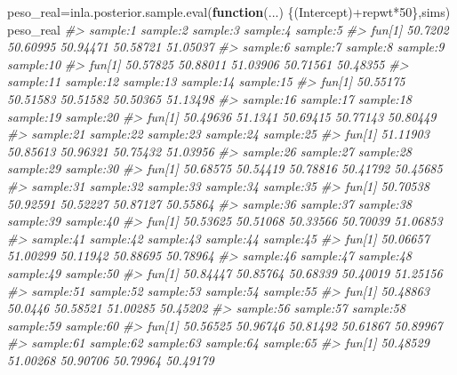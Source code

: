 \documentclass[
]{book}
\newenvironment{Shaded}{\begin{snugshade}}{\end{snugshade}}
\newcommand{\CommentTok}[1]{\textcolor[rgb]{0.56,0.35,0.01}{\textit{#1}}}
\newcommand{\ControlFlowTok}[1]{\textcolor[rgb]{0.13,0.29,0.53}{\textbf{#1}}}
\newcommand{\DecValTok}[1]{\textcolor[rgb]{0.00,0.00,0.81}{#1}}
\newcommand{\FunctionTok}[1]{\textcolor[rgb]{0.00,0.00,0.00}{#1}}
\newcommand{\NormalTok}[1]{#1}
\newcommand{\OtherTok}[1]{\textcolor[rgb]{0.56,0.35,0.01}{#1}}
\newcommand{\SpecialCharTok}[1]{\textcolor[rgb]{0.00,0.00,0.00}{#1}}
\begin{document}
\begin{Shaded}
\begin{Highlighting}[]
\NormalTok{peso\_real}\OtherTok{=}\FunctionTok{inla.posterior.sample.eval}\NormalTok{(}\ControlFlowTok{function}\NormalTok{(...) \{(Intercept)}\SpecialCharTok{+}\NormalTok{repwt}\SpecialCharTok{*}\DecValTok{50}\NormalTok{\},sims)}
\NormalTok{peso\_real}
\CommentTok{\#\textgreater{}        sample:1 sample:2 sample:3 sample:4 sample:5}
\CommentTok{\#\textgreater{} fun[1]  50.7202 50.60995 50.94471 50.58721 51.05037}
\CommentTok{\#\textgreater{}        sample:6 sample:7 sample:8 sample:9 sample:10}
\CommentTok{\#\textgreater{} fun[1] 50.57825 50.88011 51.03906 50.71561  50.48355}
\CommentTok{\#\textgreater{}        sample:11 sample:12 sample:13 sample:14 sample:15}
\CommentTok{\#\textgreater{} fun[1]  50.55175  50.51583  50.51582  50.50365  51.13498}
\CommentTok{\#\textgreater{}        sample:16 sample:17 sample:18 sample:19 sample:20}
\CommentTok{\#\textgreater{} fun[1]  50.49636   51.1341  50.69415  50.77143  50.80449}
\CommentTok{\#\textgreater{}        sample:21 sample:22 sample:23 sample:24 sample:25}
\CommentTok{\#\textgreater{} fun[1]  51.11903  50.85613  50.96321  50.75432  51.03956}
\CommentTok{\#\textgreater{}        sample:26 sample:27 sample:28 sample:29 sample:30}
\CommentTok{\#\textgreater{} fun[1]  50.68575  50.54419  50.78816  50.41792  50.45685}
\CommentTok{\#\textgreater{}        sample:31 sample:32 sample:33 sample:34 sample:35}
\CommentTok{\#\textgreater{} fun[1]  50.70538  50.92591  50.52227  50.87127  50.55864}
\CommentTok{\#\textgreater{}        sample:36 sample:37 sample:38 sample:39 sample:40}
\CommentTok{\#\textgreater{} fun[1]  50.53625  50.51068  50.33566  50.70039  51.06853}
\CommentTok{\#\textgreater{}        sample:41 sample:42 sample:43 sample:44 sample:45}
\CommentTok{\#\textgreater{} fun[1]  50.06657  51.00299  50.11942  50.88695  50.78964}
\CommentTok{\#\textgreater{}        sample:46 sample:47 sample:48 sample:49 sample:50}
\CommentTok{\#\textgreater{} fun[1]  50.84447  50.85764  50.68339  50.40019  51.25156}
\CommentTok{\#\textgreater{}        sample:51 sample:52 sample:53 sample:54 sample:55}
\CommentTok{\#\textgreater{} fun[1]  50.48863   50.0446  50.58521  51.00285  50.45202}
\CommentTok{\#\textgreater{}        sample:56 sample:57 sample:58 sample:59 sample:60}
\CommentTok{\#\textgreater{} fun[1]  50.56525  50.96746  50.81492  50.61867  50.89967}
\CommentTok{\#\textgreater{}        sample:61 sample:62 sample:63 sample:64 sample:65}
\CommentTok{\#\textgreater{} fun[1]  50.48529  51.00268  50.90706  50.79964  50.49179}

\end{Highlighting}
\end{Shaded}
\end{document}
